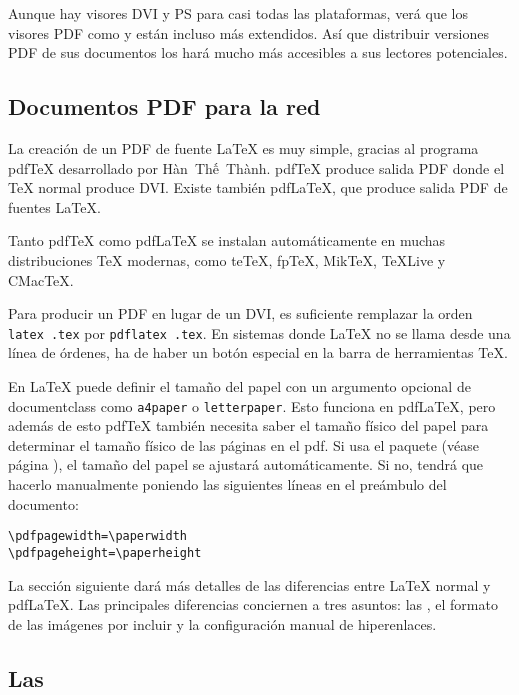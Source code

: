 Aunque hay visores DVI y PS para casi todas las plataformas, verá que los visores PDF como  y  están incluso más extendidos.  Así que distribuir versiones PDF de sus documentos los hará mucho más accesibles a sus lectores potenciales.

\subsection{Documentos PDF para la red}

La creación de un \filenomo{} PDF de fuente \LaTeX{} es muy simple, gracias al programa pdf\TeX{} desarrollado por H\`an~Th\'{\^e}~Th\`anh. pdf\TeX{} produce salida PDF donde el \TeX{} normal produce DVI.  Existe también pdf\LaTeX{}, que produce salida PDF de fuentes \LaTeX{}. 

Tanto pdf\TeX{} como pdf\LaTeX{} se instalan automáticamente en muchas distribuciones \TeX{} modernas, como te\TeX{}, fp\TeX{}, Mik\TeX, \TeX{}Live y CMac\TeX{}.

Para producir un PDF en lugar de un DVI, es suficiente remplazar la orden \texttt{latex \filenomo{}.tex} por \texttt{pdflatex \filenomo{}.tex}. En sistemas donde \LaTeX{} no se llama desde una línea de órdenes, ha de haber un botón especial en la barra de herramientas \TeX{}.

En \LaTeX{} puede definir el tamaño del papel con un argumento opcional de documentclass como \texttt{a4paper} o \texttt{letterpaper}.  Esto funciona en pdf\LaTeX{}, pero además de esto pdf\TeX{} también necesita saber el tamaño físico del papel para determinar el tamaño físico de las páginas en el \filenomo{} pdf.  Si usa el paquete  (véase página \pageref{ssec:pdfhyperref}), el tamaño del papel se ajustará automáticamente.  Si no, tendrá que hacerlo manualmente poniendo las siguientes líneas en el preámbulo del documento:
\begin{code}
\begin{verbatim}
\pdfpagewidth=\paperwidth
\pdfpageheight=\paperheight
\end{verbatim}
\end{code}

La sección siguiente dará más detalles de las diferencias entre \LaTeX{} normal y pdf\LaTeX{}.  Las principales diferencias conciernen a tres asuntos: las \fontsnomo{}, el formato de las imágenes por incluir y la configuración manual de hiperenlaces.

\subsection{Las \fontsnomo{}}

